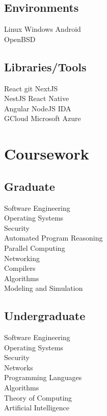 \documentclass[]{deedy-resume-openfont}
\begin{document}
\begin{minipage}[t]{0.33\textwidth}
\subsection{Environments}
Linux \textbullet{} Windows \textbullet{} Android \\ 
OpenBSD
\sectionsep

\subsection{Libraries/Tools}
React \textbullet{} git \textbullet{} NextJS \\
NestJS \textbullet{} React Native \textbullet{} \\ 
Angular \textbullet{} NodeJS \textbullet{} IDA \\
GCloud \textbullet{} Microsoft Azure
\sectionsep



\section{Coursework}
\subsection{Graduate}

Software Engineering \\
Operating Systems \\
Security \\
Automated Program Reasoning \\
Parallel Computing \\
Networking \\
Compilers \\
Algorithms \\
Modeling and Simulation
\sectionsep

\subsection{Undergraduate}
Software Engineering \\
Operating Systems \\
Security \\
Networks \\
Programming Languages \\
Algorithms \\
Theory of Computing \\
Artificial Intelligence\\
\sectionsep

%
%

\end{minipage} 
\end{document}
